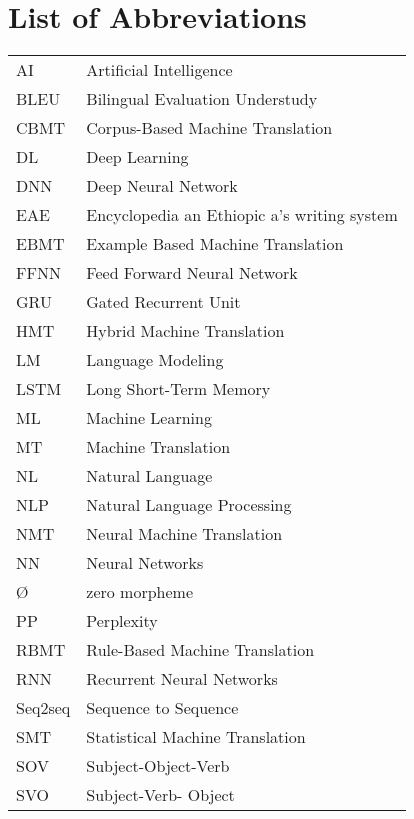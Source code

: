 \chapter*{\Large \textbf{List of Abbreviations}} %
\begin{tabular}{@{} l @{\hspace{4cm}} l @{}}
AI   & Artificial Intelligence \\    %
BLEU  & Bilingual Evaluation Understudy \\  %
CBMT & Corpus-Based Machine Translation\\
DL & Deep Learning \\ %
DNN  & Deep Neural Network \\ %
EAE & Encyclopedia an Ethiopic a’s writing system \\ %
EBMT & Example Based Machine Translation\\
FFNN & Feed Forward Neural Network \\ %
GRU & Gated Recurrent Unit \\ %
HMT & Hybrid Machine Translation \\ %
LM  & Language Modeling \\ %
LSTM & Long Short-Term Memory \\ %
ML & Machine Learning \\ %
MT  & Machine Translation \\ %
NL & Natural Language \\ %
NLP & Natural Language Processing \\ %
NMT  & Neural Machine Translation \\ %
NN & Neural Networks \\ %
Ø   & zero morpheme \\ %
PP & Perplexity \\ %
RBMT & Rule-Based Machine Translation \\ %
RNN & Recurrent Neural Networks \\ %
Seq2seq & Sequence to Sequence\\
SMT & Statistical Machine Translation \\ %
SOV & Subject-Object-Verb \\ %
SVO & Subject-Verb- Object \\ %
\end{tabular}
\vspace{-1cm}  %
